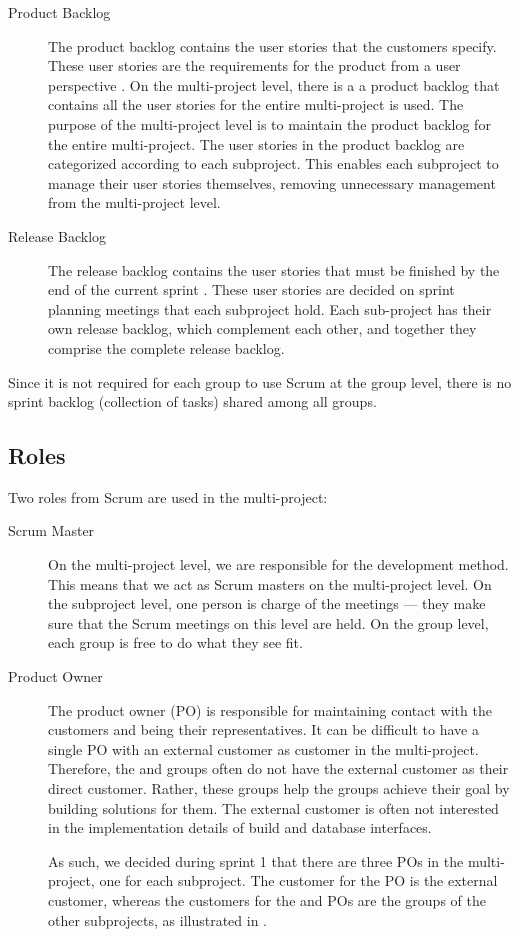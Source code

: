 \begin{description}
  \item[Product Backlog] The product backlog contains the user stories that the customers specify. These user stories are the requirements for the product from a user perspective \parencite{larman2003}. On the multi-project level, there is a a product backlog that contains all the user stories for the entire multi-project is used. The purpose of the multi-project level is to maintain the product backlog for the entire multi-project. The user stories in the product backlog are categorized according to each subproject. This enables each subproject to manage their user stories themselves, removing unnecessary management from the multi-project level.
  \item[Release Backlog] The release backlog contains the user stories that must be finished by the end of the current sprint \parencite{larman2003}. These user stories are decided on sprint planning meetings that each subproject hold. Each sub-project has their own release backlog, which complement each other, and together they comprise the complete release backlog.
\end{description}

Since it is not required for each group to use Scrum at the group level, there is no sprint backlog (collection of tasks) shared among all groups.

\subsection{Roles}
Two roles from Scrum are used in the multi-project:

\begin{description}
  \item[Scrum Master] On the multi-project level, we are responsible for the development method. This means that we act as Scrum masters on the multi-project level. On the subproject level, one person is charge of the meetings --- they make sure that the Scrum meetings on this level are held. On the group level, each group is free to do what they see fit.
  \item[Product Owner] The product owner (PO) is responsible for maintaining contact with the customers and being their representatives. It can be difficult to have a single PO with an external customer as customer in the multi-project. Therefore, the \bd and \db groups often do not have the external customer as their direct customer. Rather, these groups help the \gui groups achieve their goal by building solutions for them. The external customer is often not interested in the implementation details of build and database interfaces.

As such, we decided during sprint 1 that there are three POs in the multi-project, one for each subproject. The customer for the \gui PO is the external customer, whereas the customers for the \db and \bd POs are the groups of the other subprojects, as illustrated in .

\end{description}

